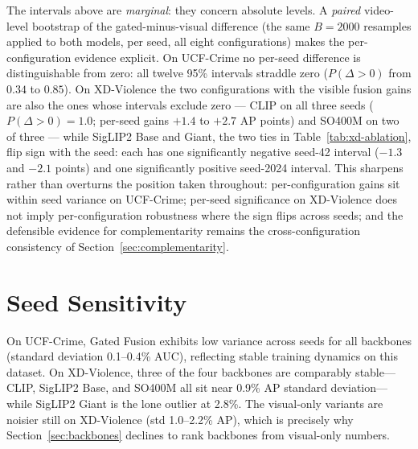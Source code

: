The intervals above are \emph{marginal}: they concern absolute levels. A
\emph{paired} video-level bootstrap of the gated-minus-visual difference
(the same $B=2000$ resamples applied to both models, per seed, all eight
configurations) makes the per-configuration evidence explicit. On UCF-Crime
no per-seed difference is distinguishable from zero: all twelve 95\%
intervals straddle zero ($P(\Delta>0)$ from $0.34$ to $0.85$). On
XD-Violence the two configurations with the visible fusion gains are also
the ones whose intervals exclude zero --- CLIP on all three seeds
($P(\Delta>0)=1.0$; per-seed gains $+1.4$ to $+2.7$ AP points) and SO400M
on two of three --- while SigLIP2 Base and Giant, the two ties in
Table~\ref{tab:xd-ablation}, flip sign with the seed: each has one
significantly negative seed-42 interval ($-1.3$ and $-2.1$ points) and one
significantly positive seed-2024 interval. This sharpens rather than
overturns the position taken throughout: per-configuration gains sit within
seed variance on UCF-Crime; per-seed significance on XD-Violence does not
imply per-configuration robustness where the sign flips across seeds; and
the defensible evidence for complementarity remains the cross-configuration
consistency of Section~\ref{sec:complementarity}.

\section{Seed Sensitivity}
\label{sec:seeds}

On UCF-Crime, Gated Fusion exhibits low variance across seeds for all
backbones (standard deviation 0.1--0.4\% AUC), reflecting stable training
dynamics on this dataset. On XD-Violence, three of the four backbones are
comparably stable---CLIP, SigLIP2 Base, and SO400M all sit near 0.9\% AP
standard deviation---while SigLIP2 Giant is the lone outlier at 2.8\%. The
visual-only variants are noisier still on XD-Violence (std 1.0--2.2\% AP),
which is precisely why Section~\ref{sec:backbones} declines to rank backbones
from visual-only numbers.


